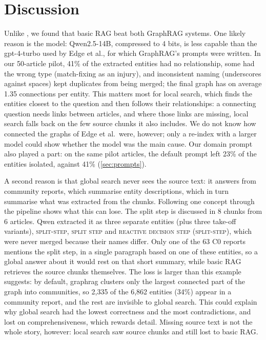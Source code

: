 \documentclass{article}
\begin{document}
\section{Discussion}
\label{sec:discussion}

Unlike \citet{edge2024local}, we found that basic RAG beat both GraphRAG systems. One
likely reason is the model: Qwen2.5-14B, compressed to 4 bits, is less capable than the gpt-4-turbo used
by Edge et al., for which GraphRAG's prompts were written. In our 50-article pilot, 41\% of the
extracted entities had no relationship, some had the wrong type (match-fixing as an injury), and
inconsistent naming (underscores against spaces) kept duplicates from being merged; the final graph has
on average 1.35 connections per entity. This matters most for local search, which finds the entities
closest to the question and then follows their relationships: a connecting question needs links
between articles, and where those links are missing, local search falls back on the few source chunks
it also includes. We do not know how connected the graphs of Edge et al.\ were, however; only a
re-index with a larger model could show whether the model was the main cause. Our domain prompt also played a part: on the same pilot articles, the default prompt left 23\% of the
entities isolated, against 41\% (\cref{sec:prompts}).

A second reason is that global search never sees the source text: it answers from community reports,
which summarise entity descriptions, which in turn summarise what was extracted from the chunks.
Following one concept through the pipeline shows what this can lose. The split step is discussed in 8
chunks from 6 articles. Qwen extracted it as three separate entities (plus three
take-off variants), \textsc{split-step},
\textsc{split step} and \textsc{reactive decision step (split-step)}, which were never merged because
their names differ. Only one of the 63 C0 reports mentions the split step, in a single paragraph based
on one of these entities, so a global answer about it would rest on that short summary, while basic RAG
retrieves the source chunks themselves. The loss is larger than this example suggests: by default,
graphrag clusters only the largest connected part of the graph into communities, so 2,335 of the
6,862 entities (34\%) appear in a community report, and the rest are invisible to global search. This
could explain why global search had the lowest correctness and the most contradictions, and lost on
comprehensiveness, which rewards detail. Missing source text is not the whole story, however: local
search saw source chunks and still lost to basic RAG.
\end{document}
